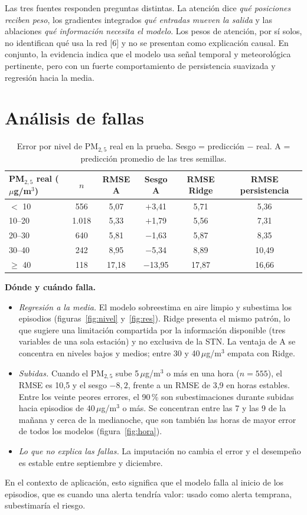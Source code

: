 \documentclass[11pt,letterpaper]{article}
\newcommand{\PM}{PM$_{2,5}$}
\newcommand{\ugm}{\,$\mu$g/m$^3$}
\begin{document}
Las tres fuentes responden preguntas distintas. La atención dice \emph{qué posiciones reciben peso}, los
gradientes integrados \emph{qué entradas mueven la salida} y las ablaciones \emph{qué información necesita el
modelo}. Los pesos de atención, por sí solos, no identifican qué usa la red [6] y no se presentan como
explicación causal. En conjunto, la evidencia indica que el modelo usa señal temporal y meteorológica
pertinente, pero con un fuerte comportamiento de persistencia suavizada y regresión hacia la media.

\section{Análisis de fallas}

\begin{table}[h]
\centering
\caption{Error por nivel de \PM{} real en la prueba. Sesgo = predicción $-$ real. A = predicción promedio de las tres semillas.}
\small
\begin{tabular}{lccccc}
\toprule
\PM{} real (\ugm) & $n$ & RMSE A & Sesgo A & RMSE Ridge & RMSE persistencia\\
\midrule
$<$ 10 & 556 & 5,07 & $+$3,41 & 5,71 & 5,36\\
10–20 & 1.018 & 5,33 & $+$1,79 & 5,56 & 7,31\\
20–30 & 640 & 5,81 & $-$1,63 & 5,87 & 8,35\\
30–40 & 242 & 8,95 & $-$5,34 & 8,89 & 10,49\\
$\geq$ 40 & 118 & 17,18 & $-$13,95 & 17,87 & 16,66\\
\bottomrule
\end{tabular}
\end{table}

\textbf{Dónde y cuándo falla.}
\begin{itemize}
\item \emph{Regresión a la media.} El modelo sobreestima en aire limpio y subestima los episodios
  (figuras~\ref{fig:nivel} y~\ref{fig:res}). Ridge presenta el mismo patrón, lo que sugiere una limitación
  compartida por la información disponible (tres variables de una sola estación) y no exclusiva de la STN. La ventaja de A se concentra en niveles bajos
  y medios; entre 30 y 40\ugm{} empata con Ridge.
\item \emph{Subidas.} Cuando el \PM{} sube 5\ugm{} o más en una hora ($n=555$), el RMSE es 10,5 y el sesgo
  $-8{,}2$, frente a un RMSE de 3,9 en horas estables. Entre los veinte peores errores, el 90\,\% son
  subestimaciones durante subidas hacia episodios de 40\ugm{} o más. Se concentran entre las 7 y las 9 de
  la mañana y cerca de la medianoche, que son también las horas de mayor error de todos los modelos
  (figura~\ref{fig:hora}).
\item \emph{Lo que no explica las fallas.} La imputación no cambia el error y el desempeño es estable entre
  septiembre y diciembre.
\end{itemize}
En el contexto de aplicación, esto significa que el modelo falla al inicio de los episodios, que es cuando
una alerta tendría valor: usado como alerta temprana, subestimaría el riesgo.
\end{document}
